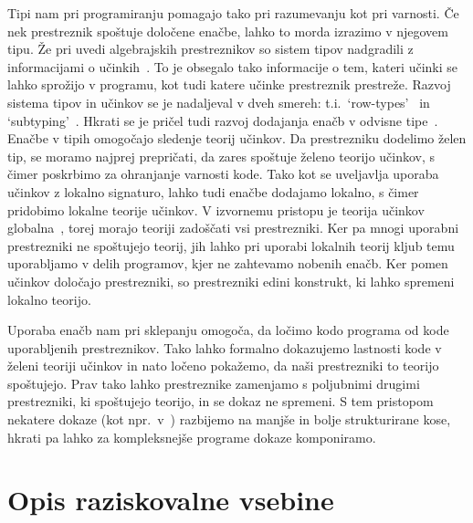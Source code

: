 \documentclass{article}
\begin{document}
Tipi nam pri programiranju pomagajo tako pri razumevanju kot pri varnosti. Če nek prestreznik spoštuje določene enačbe, lahko to morda izrazimo v njegovem tipu. Že pri uvedi algebrajskih prestreznikov so sistem tipov nadgradili z informacijami o učinkih~\cite{DBLP:conf/esop/PlotkinP09}. To je obsegalo tako informacije o tem, kateri učinki se lahko sprožijo v programu, kot tudi katere učinke prestreznik prestreže. Razvoj sistema tipov in učinkov se je nadaljeval v dveh smereh: t.i.\ `row-types'~\cite{DBLP:conf/icfp/HillerstromL16} in `subtyping'~\cite{DBLP:conf/esop/SalehKPS18}. Hkrati se je pričel tudi razvoj dodajanja enačb v odvisne tipe~\cite{DBLP:journals/pacmpl/Ahman18}. Enačbe v tipih omogočajo sledenje teorij učinkov. Da prestrezniku dodelimo želen tip, se moramo najprej prepričati, da zares spoštuje želeno teorijo učinkov, s čimer poskrbimo za ohranjanje varnosti kode. Tako kot se uveljavlja uporaba učinkov z lokalno signaturo, lahko tudi enačbe dodajamo lokalno, s čimer pridobimo lokalne teorije učinkov. V izvornemu pristopu je teorija učinkov globalna~\cite{DBLP:conf/esop/PlotkinP09}, torej morajo teoriji zadoščati vsi prestrezniki. Ker pa mnogi uporabni prestrezniki ne spoštujejo teorij, jih lahko pri uporabi lokalnih teorij kljub temu uporabljamo v delih programov, kjer ne zahtevamo nobenih enačb. Ker pomen učinkov določajo prestrezniki, so prestrezniki edini konstrukt, ki lahko spremeni lokalno teorijo.

Uporaba enačb nam pri sklepanju omogoča, da ločimo kodo programa od kode uporabljenih prestreznikov. Tako lahko formalno dokazujemo lastnosti kode v želeni teoriji učinkov in nato ločeno pokažemo, da naši prestrezniki to teorijo spoštujejo. Prav tako lahko prestreznike zamenjamo s poljubnimi drugimi prestrezniki, ki spoštujejo teorijo, in se dokaz ne spremeni. S tem pristopom nekatere dokaze (kot npr.\ v~\cite{DBLP:journals/jlp/BauerP15}) razbijemo na manjše in bolje strukturirane kose, hkrati pa lahko za kompleksnejše programe dokaze komponiramo.

\section*{Opis raziskovalne vsebine}
\end{document}
